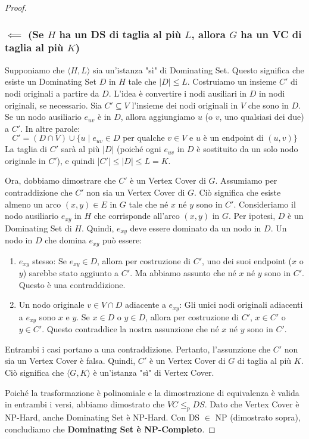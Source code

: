 \documentclass[a4paper]{article}
\theoremstyle{definition} %
\theoremstyle{definition} %
\begin{document}
\begin{proof}
\subsubsection{$\impliedby$ (Se $H$ ha un DS di taglia al più $L$, allora $G$ ha un VC di taglia al più $K$)}
Supponiamo che $\langle H, L \rangle$ sia un'istanza "sì" di Dominating Set. Questo significa che esiste un Dominating Set $D$ in $H$ tale che $|D| \le L$.
Costruiamo un insieme $C'$ di nodi originali a partire da $D$. L'idea è convertire i nodi ausiliari in $D$ in nodi originali, se necessario.
Sia $C' \subseteq V$ l'insieme dei nodi originali in $V$ che sono in $D$. Se un nodo ausiliario $e_{uv}$ è in $D$, allora aggiungiamo $u$ (o $v$, uno qualsiasi dei due) a $C'$. In altre parole:
\[ C' = (D \cap V) \cup \{ u \mid e_{uv} \in D \text{ per qualche } v \in V \text{ e } u \text{ è un endpoint di } (u,v) \} \]
La taglia di $C'$ sarà al più $|D|$ (poiché ogni $e_{uv}$ in $D$ è sostituito da un solo nodo originale in $C'$), e quindi $|C'| \le |D| \le L = K$.

Ora, dobbiamo dimostrare che $C'$ è un Vertex Cover di $G$.
Assumiamo per contraddizione che $C'$ non sia un Vertex Cover di $G$. Ciò significa che esiste almeno un arco $(x, y) \in E$ in $G$ tale che né $x$ né $y$ sono in $C'$.
Consideriamo il nodo ausiliario $e_{xy}$ in $H$ che corrisponde all'arco $(x, y)$ in $G$.
Per ipotesi, $D$ è un Dominating Set di $H$. Quindi, $e_{xy}$ deve essere dominato da un nodo in $D$.
Un nodo in $D$ che domina $e_{xy}$ può essere:
\begin{enumerate}
    \item $e_{xy}$ stesso: Se $e_{xy} \in D$, allora per costruzione di $C'$, uno dei suoi endpoint ($x$ o $y$) sarebbe stato aggiunto a $C'$. Ma abbiamo assunto che né $x$ né $y$ sono in $C'$. Questo è una contraddizione.
    \item Un nodo originale $v \in V \cap D$ adiacente a $e_{xy}$: Gli unici nodi originali adiacenti a $e_{xy}$ sono $x$ e $y$. Se $x \in D$ o $y \in D$, allora per costruzione di $C'$, $x \in C'$ o $y \in C'$. Questo contraddice la nostra assunzione che né $x$ né $y$ sono in $C'$.
\end{enumerate}
Entrambi i casi portano a una contraddizione. Pertanto, l'assunzione che $C'$ non sia un Vertex Cover è falsa.
Quindi, $C'$ è un Vertex Cover di $G$ di taglia al più $K$. Ciò significa che $\langle G, K \rangle$ è un'istanza "sì" di Vertex Cover.

Poiché la trasformazione è polinomiale e la dimostrazione di equivalenza è valida in entrambi i versi, abbiamo dimostrato che $VC \le_p DS$. Dato che Vertex Cover è NP-Hard, anche Dominating Set è NP-Hard. Con DS $\in$ NP (dimostrato sopra), concludiamo che \textbf{Dominating Set è NP-Completo}.
\end{proof}
\end{document}
